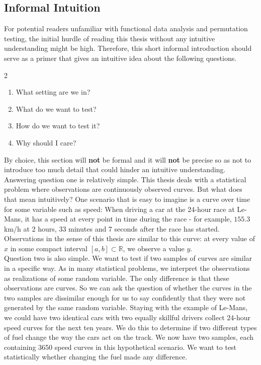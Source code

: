 \documentclass[12pt, a4paper]{article}
\theoremstyle{MAstyle} \newtheorem{assumption}{Assumption}[section]
\theoremstyle{MAstyle} \newtheorem{definition}{Definition}[section]
\theoremstyle{MAstyle} \newtheorem{theorem}{Theorem}[section]
\begin{document}
		\subsection{Informal Intuition}\label{Intuition}
			For potential readers unfamiliar with functional data analysis and permutation testing, the initial hurdle of reading this thesis without any intuitive understanding might be high. Therefore, this short informal introduction should serve as a primer that gives an intuitive idea about the following questions.
			\begin{multicols}{2}
				\begin{enumerate}
					\item What setting are we in?
					\item What do we want to test?
					\item How do we want to test it?
					\item Why should I care?
				\end{enumerate}
			\end{multicols}
			By choice, this section will \textbf{not} be formal and it will \textbf{not} be precise so as not to introduce too much detail that could hinder an intuitive understanding.\\
			
			Answering question one is relatively simple. This thesis deals with a statistical problem where observations are continuously observed curves. But what does that mean intuitively? One scenario that is easy to imagine is a curve over time for some variable such as speed: When driving a car at the 24-hour race at Le-Mans, it has a speed at every point in time during the race - for example, $155.3$ km/h at 2 hours, 33 minutes and 7 seconds after the race has started. Observations in the sense of this thesis are similar to this curve: at every value of $x$ in some compact interval $[a,b] \subset \mathbb{R}$, we observe a value $y$.\\
			
			Question two is also simple. We want to test if two samples of curves are similar in a specific way. As in many statistical problems, we interpret the observations as realizations of some random variable. The only difference is that these observations are curves. So we can ask the question of whether the curves in the two samples are dissimilar enough for us to say confidently that they were not generated by the same random variable. 
			Staying with the example of Le-Mans, we could have two identical cars with two equally skillful drivers collect 24-hour speed curves for the next ten years. We do this to determine if two different types of fuel change the way the cars act on the track. We now have two samples, each containing 3650 speed curves in this hypothetical scenario. 
			We want to test statistically whether changing the fuel made any difference.\\
			
\end{document}
